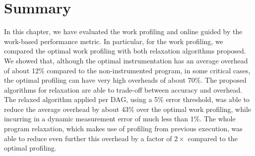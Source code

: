 %
%
%

\section{Summary}

In this chapter, we have evaluated the work profiling and online {\itercomp} guided by the work-based performance metric.
In particular, for the work profiling, we compared the optimal work profiling with both relaxation algorithms proposed.
We showed that, although the optimal instrumentation has an average overhead of about 12\% compared to the non-instrumented program,
in some critical cases, the optimal profiling can have very high overheads of about 70\%.
The proposed algorithms for relaxation are able to trade-off between accuracy and overhead.
The relaxed algorithm applied per DAG, using a 5\% error threshold, was able to reduce the average overhead by about 43\% over the optimal work profiling, while incurring in a dynamic measurement error of much less than 1\%.
The whole program relaxation, which makes use of profiling from previous execution, was able to reduce even further this overhead by a factor of $2\times$ compared to the optimal profiling.

